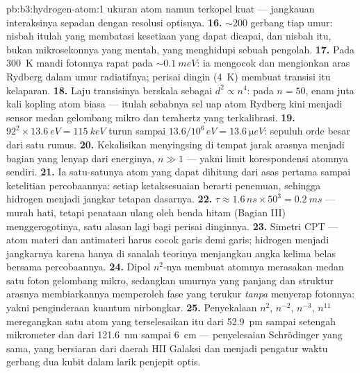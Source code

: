 \begin{solution}{pb:b3:hydrogen-atom:1}
ukuran atom namun terkopel kuat --- jangkauan interaksinya sepadan
dengan resolusi optisnya.
\textbf{16.} $\sim 200$ gerbang tiap umur: nisbah itulah yang
membatasi kesetiaan yang dapat dicapai, dan nisbah itu, bukan
mikrosekonnya yang mentah, yang menghidupi sebuah pengolah.
\textbf{17.} Pada \qty{300}{K} mandi fotonnya rapat pada
$\sim\qty{0.1}{meV}$: ia mengocok dan mengionkan aras Rydberg dalam
umur radiatifnya; perisai dingin (\qty{4}{K}) membuat transisi itu
kelaparan.
\textbf{18.} Laju transisinya berskala sebagai $d^2 \propto n^4$: pada $n =
50$, enam juta kali kopling atom biasa --- itulah sebabnya sel uap
atom Rydberg kini menjadi sensor medan gelombang mikro dan terahertz
yang terkalibrasi.
\textbf{19.} $92^2 \times \qty{13.6}{eV} = \qty{115}{keV}$ turun sampai
$13.6/10^6\,\unit{eV} = \qty{13.6}{\micro eV}$: sepuluh orde besar dari
satu rumus.
\textbf{20.} Kekalisikan menyingsing di tempat jarak arasnya menjadi
bagian yang lenyap dari energinya, $n \gg 1$ --- yakni limit
korespondensi atomnya sendiri.
\textbf{21.} Ia satu-satunya atom yang dapat dihitung dari asas pertama
sampai ketelitian percobaannya: setiap ketaksesuaian berarti penemuan,
sehingga hidrogen menjadi jangkar tetapan dasarnya.
\textbf{22.} $\tau \approx 1.6\,\unit{ns} \times 50^3 =
\qty{0.2}{ms}$ --- murah hati, tetapi penataan ulang oleh benda hitam
(Bagian III) menggerogotinya, satu alasan lagi bagi perisai dinginnya.
\textbf{23.} Simetri CPT --- atom materi dan antimateri harus cocok
garis demi garis; hidrogen menjadi jangkarnya karena hanya di sanalah
teorinya menjangkau angka kelima belas bersama percobaannya.
\textbf{24.} Dipol $n^2$-nya membuat atomnya merasakan medan satu foton
gelombang mikro, sedangkan umurnya yang panjang dan struktur arasnya
membiarkannya memperoleh fase yang terukur \emph{tanpa} menyerap
fotonnya: yakni penginderaan kuantum nirbongkar.
\textbf{25.} Penyekalaan $n^2$, $n^{-2}$, $n^{-3}$, $n^{11}$
meregangkan satu atom yang terselesaikan itu dari \qty{52.9}{pm} sampai
setengah mikrometer dan dari \qty{121.6}{nm} sampai \qty{6}{cm} ---
penyelesaian Schrödinger yang sama, yang bersiaran dari daerah HII
Galaksi dan menjadi pengatur waktu gerbang dua kubit dalam larik
penjepit optis.
\end{solution}
